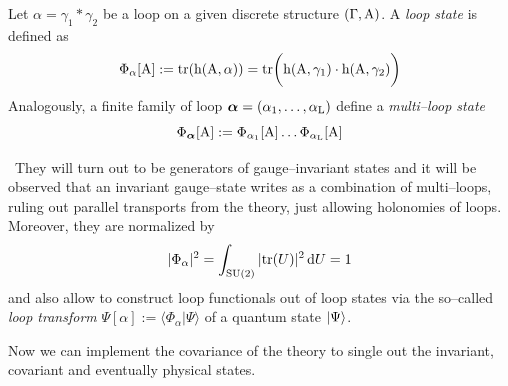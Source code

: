 \begin{defi}
    Let $\alpha=\gamma_1*\gamma_2$ be a loop on a given discrete structure $(\Gamma,\text{\normalfont A})$. A \emph{loop state} is defined as
    $$\Phi_\alpha[\text{\normalfont A}]:=\text{\normalfont tr}(\text{\normalfont h}(\text{\normalfont A},\alpha))=\text{\normalfont tr}\bigg(\text{\normalfont h}(\text{\normalfont A},\gamma_1)\cdot\text{\normalfont h}(\text{\normalfont A},\gamma_2)\bigg)$$
    Analogously, a finite family of loop $\boldsymbol{\alpha}=(\alpha_1,\hdots,\alpha_{\text{\normalfont L}})$ define a \emph{multi--loop state} 
$$\Phi_{\boldsymbol{\alpha}}[\text{\normalfont A}]:=\Phi_{\alpha_1}[\text{\normalfont A}]\hdots\Phi_{\alpha_{\text{\normalfont L}}}[\text{\normalfont A}]$$
\end{defi}
\,\newline
They will turn out to be generators of gauge--invariant states and it will be observed that an invariant gauge--state writes as a combination of multi--loops, ruling out parallel transports from the theory, just allowing holonomies of loops. Moreover, they are normalized by
$$|\Phi_\alpha|^2=\int_{\text{\normalfont SU}(2)}|\text{\normalfont tr}(U)|^2\,\text{\normalfont d} U=1$$
and also allow to construct loop functionals out of loop states via the so--called \emph{loop transform} $\Psi[\alpha]:=\langle{\Phi_\alpha}|{\Psi}\rangle$ of a quantum state $\left| \Psi \right >$.

Now we can implement the covariance of the theory to single out the invariant, covariant and eventually physical states.


